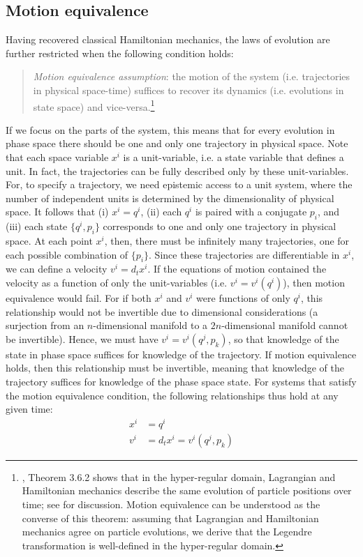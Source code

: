 \documentclass[12pt, english, twoside]{article} %
\newcommand\bs{\begin{singlespace}}
\newcommand\es{\end{singlespace}}
\begin{document}
\subsection{Motion equivalence}
\label{motion}

Having recovered classical Hamiltonian mechanics, the laws of evolution are further restricted when the following condition holds:


\begin{quotation}
\bs \noindent
\textit{Motion equivalence assumption}: the motion of the system (i.e. trajectories in physical space-time) suffices to recover its dynamics (i.e. evolutions in state space) and vice-versa.\footnote{ \textcites[218]{Abraham}, Theorem 3.6.2 shows that in the hyper-regular domain, Lagrangian and Hamiltonian mechanics describe the same evolution of particle positions over time; see \textcites[1180-1181]{Barrett2} for discussion. Motion equivalence can be understood as the converse of this theorem: assuming that Lagrangian and Hamiltonian mechanics agree on particle evolutions, we derive that the Legendre transformation is well-defined in the hyper-regular domain.} \es
\end{quotation}


If we focus on the parts of the system, this means that for every evolution in phase space there should be one and only one trajectory in physical space. Note that each space variable $x^i$ is a unit-variable, i.e. a state variable that defines a unit. In fact, the trajectories can be fully described only by these unit-variables. For, to specify a trajectory, we need epistemic access to a unit system, where the number of independent units is determined by the dimensionality of physical space. It follows that (i) $x^i = q^i$, (ii) each $q^i$ is paired with a conjugate $p_i$, and (iii) each state $\{q^i, p_i\}$ corresponds to one and only one trajectory in physical space. At each point $x^i$, then, there must be infinitely many trajectories, one for each possible combination of $\{p_i\}$. Since these trajectories are differentiable in $x^i$, we can define a velocity $v^i = d_t x^i$. If the equations of motion contained the velocity as a function of only the unit-variables (i.e. $v^i=v^i(q^i)$), then motion equivalence would fail. For if both $x^i$ and $v^i$ were functions of only $q^i$, this relationship would not be invertible due to dimensional considerations (a surjection from an $n$-dimensional manifold to a $2n$-dimensional manifold cannot be invertible). Hence, we must have $v^i=v^i(q^j, p_k)$, so that knowledge of the state in phase space suffices for knowledge of the trajectory. If motion equivalence holds, then this relationship must be invertible, meaning that knowledge of the trajectory suffices for knowledge of the phase space state. For systems that satisfy the motion equivalence condition, the following relationships thus hold at any given time:
\begin{equation}\label{weak_equivalence}
\begin{aligned}
x^i &= q^i \\
v^i &= d_t x^i = v^i(q^j, p_k)
\end{aligned}
\end{equation}
\end{document}
